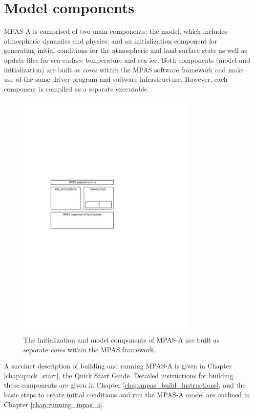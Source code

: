\section{Model components}

MPAS-A is comprised of two main components: the model, which includes
atmospheric dynamics and physics; and an initialization component for
generating initial conditions for the atmospheric and land-surface state as well as update files for sea-surface
temperature and sea ice. Both components (model and initialization) are built as {\it cores}
within the MPAS software framework and make use of the same driver
program and software infrastructure.  However, each component is compiled as
a separate executable.

\begin{figure}[htb]
\begin{center}
\includegraphics[width=3.5in]{figures/mpas-a_components.pdf}
\caption{The initialization and model components of MPAS-A are built as
separate {\em cores} within the MPAS framework.}
\label{fig:atm_components}
\end{center}
\end{figure}

A succinct description of building and running MPAS-A is given in Chapter \ref{chap:quick_start}, the Quick Start Guide.
Detailed instructions for building these components are given in Chapter
\ref{chap:mpas_build_instructions}, and the basic steps to create initial
conditions and run the MPAS-A model are outlined in Chapter
\ref{chap:running_mpas_a}.
